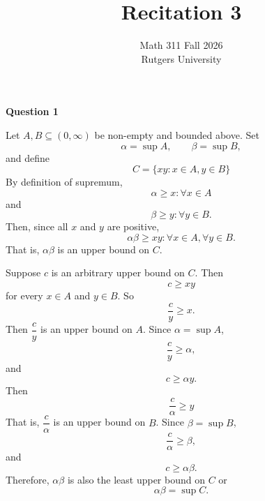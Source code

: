 \documentclass[12pt]{article}
\title{Recitation 3}
\author{Math 311 Fall 2026 \\ Rutgers University}
\date{}
\begin{document}
\maketitle

\noindent{} \textbf{Question 1}

Let $A, B \subseteq (0, \infty)$ be non-empty and bounded above. Set
\[
    \alpha = \sup A, \qquad \beta = \sup B,
\]
and define
\[
    C =\{xy : x \in A, y \in B\}
\]
By definition of supremum,
\[
    \alpha \geq x : \forall x \in A
\]
and
\[
    \beta \geq y : \forall y \in B.
\]
Then, since all $x$ and $y$ are positive,
\[
    \alpha \beta \geq xy : \forall x \in A, \forall y \in B.
\]
That is, $\alpha \beta$ is an upper bound on $C$.

Suppose $c$ is an arbitrary upper bound on $C$.
Then
\[
    c \geq xy
\]
for every $x \in A$ and $y \in B$.
So
\[
    \frac{c}{y} \geq x.
\]
Then $\dfrac{c}{y}$ is an upper bound on $A$.
Since $\alpha = \sup A$,
\[
    \frac{c}{y} \geq \alpha,
\]
and
\[
    c \geq \alpha y.
\]
Then
\[
    \frac{c}{\alpha} \geq y
\]
That is, $\dfrac{c}{\alpha}$ is an upper bound on $B$.
Since $\beta = \sup B$,
\[
    \frac{c}{\alpha} \geq \beta,
\]
and
\[
    c \geq \alpha \beta.
\]
Therefore, $\alpha \beta$ is also the least upper bound on $C$ or
\[
    \alpha \beta = \sup C.
\]
\end{document}

